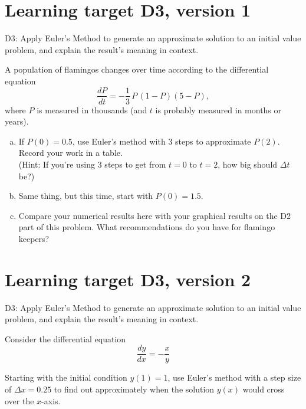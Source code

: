 

\usepackage{pgfplots}
\pgfplotsset{compat=1.5}




\everymath{\displaystyle}

\section{Learning target D3, version 1}

D3: Apply Euler's Method to generate an approximate solution to an initial value problem, and explain the result's meaning in context.

\hrulefill

A population of flamingos changes over time according to the differential equation 
\[\dfrac{dP}{dt} = -\frac{1}{3}\, P\, (1-P)(5-P),\]
where $P$ is measured in thousands (and $t$ is probably measured in months or years).

\begin{enumerate}[(a), leftmargin=0pt]
	\item If $P(0) = 0.5$, use Euler's method with 3 steps to approximate $P(2)$. Record your work in a table.\\
	(Hint: If you're using 3 steps to get from $t=0$ to $t=2$, how big should $\Delta t$ be?)
	\vfill
	\item Same thing, but this time, start with $P(0) = 1.5$.
	\vfill
	\item Compare your numerical results here with your graphical results on the D2 part of this problem. What recommendations do you have for flamingo keepers?
\end{enumerate}

\pagebreak

\section{Learning target D3, version 2}

D3: Apply Euler's Method to generate an approximate solution to an initial value problem, and explain the result's meaning in context.

\hrulefill

Consider the differential equation \[\frac{dy}{dx} = -\frac{x}{y}\]

Starting with the initial condition $y(1)=1$, use Euler's method with a step size of $\Delta x = 0.25$ to find out approximately when the solution $y(x)$ would cross over the $x$-axis.

